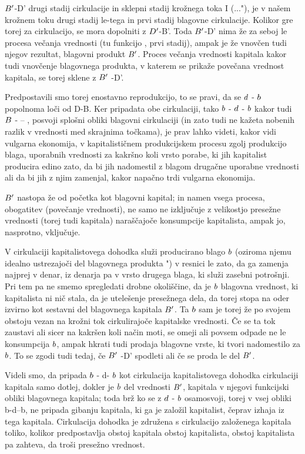 \documentclass[kapital_02.tex]{subfiles}
\begin{document}
\( B' \)-D' drugi stadij cirkulacije in sklepni stadij krožnega toka I (\KPED...\KPED"), je v našem krožnem toku drugi stadij le-tega in prvi stadij blagovne cirkulacije. Kolikor gre torej za cirkulacijo, se mora dopolniti z \( D' \)-B'. Toda \( B' \)-D' nima že za seboj le procesa večanja vrednosti (tu funkcijo \KPEP, prvi stadij), ampak je že vnovčen tudi njegov rezultat, blagovni produkt \( B' \). Proces večanja vrednosti kapitala kakor tudi vnovčenje blagovnega produkta, v katerem se prikaže povečana vrednost kapitala, se torej sklene z \( B' \) -D'.

Predpostavili smo torej enostavno reprodukcijo, to se pravi, da se \( d \) - \( b \) popolnoma loči od D-B. Ker pripadata obe cirkulaciji, tako \( b \) - \( d \) - \( b \) kakor tudi \( B \) - \KPED-- \KPEB, posvoji splošni obliki blagovni cirkulaciji (in zato tudi ne kažeta nobenih razlik v vrednosti med skrajnima točkama), je prav lahko videti, kakor vidi vulgarna ekonomija, v kapitalističnem produkcijskem procesu zgolj produkcijo blaga, uporabnih vrednosti za kakršno koli vrsto porabe, ki jih kapitalist producira edino zato, da bi jih nadomestil z blagom drugačne uporabne vrednosti ali da bi jih z njim zamenjal, kakor napačno trdi vulgarna ekonomija.

\( B' \) nastopa že od početka kot blagovni kapital; in namen vsega procesa, obogatitev (povečanje vrednosti), ne samo ne izključuje z velikostjo presežne vrednosti (torej tudi kapitala) naraščajoče konsumpcije kapitalista, ampak jo, nasprotno, vključuje.

V cirkulaciji kapitalistovega dohodka služi producirano blago \( b \) (oziroma njemu idealno ustrezajoči del blagovnega produkta \KPEB") v resnici le zato, da ga zamenja najprej v denar, iz denarja pa v vrsto drugega blaga, ki služi zasebni potrošnji. Pri tem pa ne smemo spregledati drobne okoliščine, da je \( b \) blagovna vrednost, ki kapitalista ni nič stala, da je utelešenje presežnega dela, da torej stopa na oder izvirno kot sestavni del blagovnega kapitala \( B' \). Ta \( b \) sam je torej že po svojem obstoju vezan na krožni tok cirkulirajoče kapitalske vrednosti. Če se ta tok zaustavi ali sicer na kakršen koli način moti, se omeji ali povsem odpade ne le konsumpcija \( b \), ampak hkrati tudi prodaja blagovne vrste, ki tvori nadomestilo za \( b \). To se zgodi tudi tedaj, če \( B' \) -D' spodleti ali če se proda le del \( B' \).

Videli smo, da pripada \( b \) - d- \( b \) kot cirkulacija kapitalistovega dohodka cirkulaciji kapitala samo dotlej, dokler je \( b \) del vrednosti \( B' \), kapitala v njegovi funkcijski obliki blagovnega kapitala; toda brž ko se z \( d \) - \( b \) osamosvoji, torej v vsej obliki b-d--b, ne pripada gibanju kapitala, ki ga je založil kapitalist, čeprav izhaja iz tega kapitala. Cirkulacija dohodka je združena s cirkulacijo založenega kapitala toliko, kolikor predpostavlja obstoj kapitala obstoj kapitalista, obstoj kapitalista pa zahteva, da troši presežno vrednost.
\end{document}
